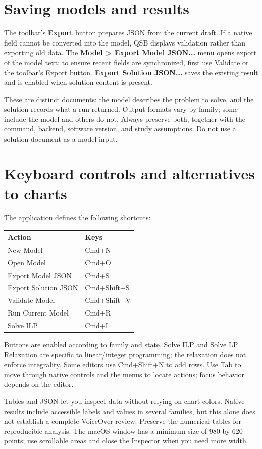 \section{Saving models and results}
The toolbar's \textbf{Export} button prepares JSON from the current draft. If a
native field cannot be converted into the model, QSB displays validation rather
than exporting old data. The \textbf{Model > Export Model JSON...} menu opens
export of the model text; to ensure recent fields are synchronized, first use
Validate or the toolbar's Export button. \textbf{Export Solution JSON...} saves
the existing result and is enabled when solution content is present.

These are distinct documents: the model describes the problem to solve, and the
solution records what a run returned. Output formats vary by family; some
include the model and others do not. Always preserve both, together with the
command, backend, software version, and study assumptions. Do not use a solution
document as a model input.

\section{Keyboard controls and alternatives to charts}
The application defines the following shortcuts:
\begin{center}
\begin{tabular}{ll}
\toprule
Action & Keys\\
\midrule
New Model & Cmd+N\\
Open Model & Cmd+O\\
Export Model JSON & Cmd+S\\
Export Solution JSON & Cmd+Shift+S\\
Validate Model & Cmd+Shift+V\\
Run Current Model & Cmd+R\\
Solve ILP & Cmd+I\\
\bottomrule
\end{tabular}
\end{center}
Buttons are enabled according to family and state. Solve ILP and Solve LP
Relaxation are specific to linear/integer programming; the relaxation does not
enforce integrality. Some editors use Cmd+Shift+N to add rows. Use Tab to move
through native controls and the menus to locate actions; focus behavior depends
on the editor.

Tables and JSON let you inspect data without relying on chart colors. Native
results include accessible labels and values in several families, but this
alone does not establish a complete VoiceOver review. Preserve the numerical
tables for reproducible analysis. The macOS window has a minimum size of 980 by
620 points; use scrollable areas and close the Inspector when you need more width.

